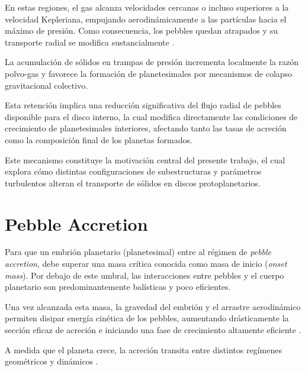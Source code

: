 En estas regiones, el gas alcanza velocidades cercanas o incluso superiores a la velocidad Kepleriana, empujando aerodinámicamente a las partículas hacia el máximo de presión. Como consecuencia, los pebbles quedan atrapados y su transporte radial se modifica sustancialmente \citep{Pinilla2012, Ataiee2018}.


La acumulación de sólidos en trampas de presión incrementa localmente la razón polvo-gas y favorece la formación de planetesimales \citep{Carrera2021} por mecanismos de colapso gravitacional colectivo.

Esta retención implica una reducción significativa del flujo radial de pebbles disponible para el disco interno, la cual modifica directamente las condiciones de crecimiento de planetesimales interiores, afectando tanto las tasas de acreción como la composición final de los planetas formados.

Este mecanismo constituye la motivación central del presente trabajo, el cual explora cómo distintas configuraciones de subestructuras y parámetros turbulentos alteran el transporte de sólidos en discos protoplanetarios.


\section{Pebble Accretion}
\label{sec:pebble_accretion}


Para que un embrión planetario (planetesimal) entre al régimen de \textit{pebble accretion}, debe superar una masa crítica conocida como masa de inicio (\textit{onset mass}). Por debajo de este umbral, las interacciones entre pebbles y el cuerpo planetario son predominantemente balísticas y poco eficientes.

Una vez alcanzada esta masa, la gravedad del embrión y el arrastre aerodinámico permiten disipar energía cinética de los pebbles, aumentando drásticamente la sección eficaz de acreción e iniciando una fase de crecimiento altamente eficiente \citep{Lambrechts2014, Ormel2017}.


A medida que el planeta crece, la acreción transita entre distintos regímenes geométricos y dinámicos \citep{Ormel2017}.

